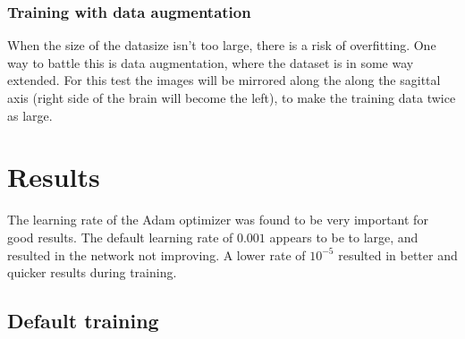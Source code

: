 \documentclass{kththesis}
\begin{document}
\subsection{Training with data augmentation}
When the size of the datasize isn't too large, there is a risk of overfitting. One way to battle this is data augmentation, where the dataset is in some way extended. For this test the images will be mirrored along the along the sagittal axis (right side of the brain will become the left), to make the training data twice as large.

\chapter{Results}

The learning rate of the Adam optimizer was found to be very important for good results. The default learning rate of $0.001$ appears to be to large, and resulted in the network not improving. A lower rate of $10^{-5}$ resulted in better and quicker results during training.

\section{Default training}
\end{document}
